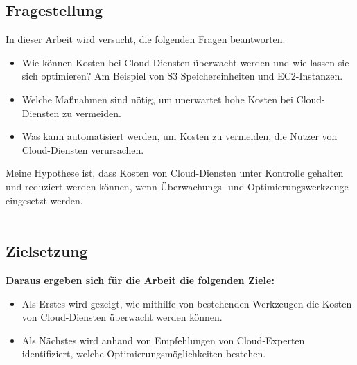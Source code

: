 \subsection{Fragestellung}
\begin{flushleft}
In dieser Arbeit wird versucht, die folgenden Fragen beantworten. 
\end{flushleft}

\begin{itemize}
    \item
        Wie können Kosten bei Cloud-Diensten überwacht werden und wie lassen sie sich optimieren? 
        Am Beispiel von S3 Speichereinheiten und EC2-Instanzen.
    \item
        Welche Maßnahmen sind nötig, um unerwartet hohe Kosten bei Cloud-Diensten zu vermeiden.
    \item 
        Was kann automatisiert werden, um Kosten zu vermeiden, die Nutzer von Cloud-Diensten verursachen.  
\end{itemize}
Meine Hypothese ist, dass Kosten von Cloud-Diensten unter Kontrolle gehalten und
reduziert werden können, wenn Überwachungs- und Optimierungswerkzeuge eingesetzt werden.
\\\\

\subsection{Zielsetzung}
\textbf{Daraus ergeben sich für die Arbeit die folgenden Ziele:}\\ 
\begin{itemize}
    \item
        Als Erstes wird gezeigt, wie mithilfe von bestehenden Werkzeugen  die Kosten von Cloud-Diensten überwacht werden können.
    \item
        Als Nächstes wird anhand von Empfehlungen von Cloud-Experten identifiziert, welche Optimierungsmöglichkeiten bestehen.\\
\end{itemize}



